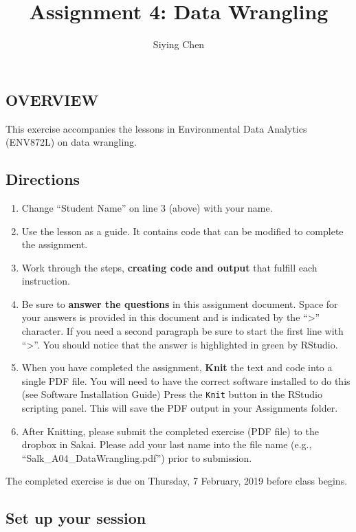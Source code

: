 \documentclass[]{article}
\title{Assignment 4: Data Wrangling}
\author{Siying Chen}
\date{}
\providecommand{\tightlist}{%
  \setlength{\itemsep}{0pt}\setlength{\parskip}{0pt}}
\begin{document}
\maketitle

\subsection{OVERVIEW}\label{overview}

This exercise accompanies the lessons in Environmental Data Analytics
(ENV872L) on data wrangling.

\subsection{Directions}\label{directions}

\begin{enumerate}
\def\labelenumi{\arabic{enumi}.}
\tightlist
\item
  Change ``Student Name'' on line 3 (above) with your name.
\item
  Use the lesson as a guide. It contains code that can be modified to
  complete the assignment.
\item
  Work through the steps, \textbf{creating code and output} that fulfill
  each instruction.
\item
  Be sure to \textbf{answer the questions} in this assignment document.
  Space for your answers is provided in this document and is indicated
  by the ``\textgreater{}'' character. If you need a second paragraph be
  sure to start the first line with ``\textgreater{}''. You should
  notice that the answer is highlighted in green by RStudio.
\item
  When you have completed the assignment, \textbf{Knit} the text and
  code into a single PDF file. You will need to have the correct
  software installed to do this (see Software Installation Guide) Press
  the \texttt{Knit} button in the RStudio scripting panel. This will
  save the PDF output in your Assignments folder.
\item
  After Knitting, please submit the completed exercise (PDF file) to the
  dropbox in Sakai. Please add your last name into the file name (e.g.,
  ``Salk\_A04\_DataWrangling.pdf'') prior to submission.
\end{enumerate}

The completed exercise is due on Thursday, 7 February, 2019 before class
begins.

\subsection{Set up your session}\label{set-up-your-session}
\end{document}
